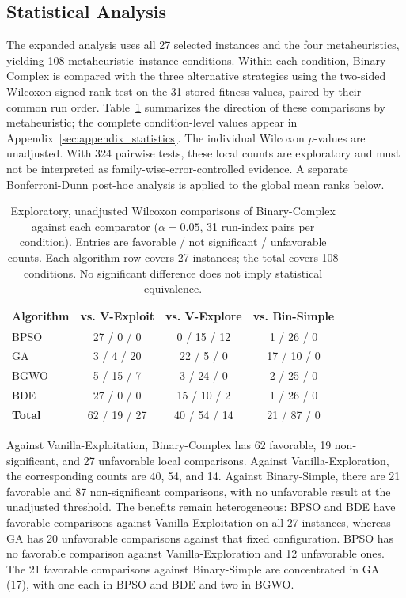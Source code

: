 \documentclass[journal,article,submit,moreauthors]{Definitions/mdpi}
\begin{document}
\subsection{Statistical Analysis}
\label{subsec:statistical_analysis}

The expanded analysis uses all 27 selected instances and the four
metaheuristics, yielding 108 metaheuristic--instance conditions. Within each
condition, Binary-Complex is compared with the three alternative strategies
using the two-sided Wilcoxon signed-rank test on the 31 stored fitness values,
paired by their common run order. Table~\ref{tab:wilcoxon_tests} summarizes
the direction of these comparisons by metaheuristic; the complete
condition-level values appear in Appendix~\ref{sec:appendix_statistics}.
The individual Wilcoxon $p$-values are unadjusted. With 324 pairwise tests,
these local counts are exploratory and must not be interpreted as
family-wise-error-controlled evidence. A separate Bonferroni-Dunn post-hoc
analysis is applied to the global mean ranks below.

\begin{table}[htbp]
  \centering
  \small
  \caption{Exploratory, unadjusted Wilcoxon comparisons of Binary-Complex
  against each comparator ($\alpha=0.05$, 31 run-index pairs per condition).
  Entries are favorable / not significant / unfavorable counts.
  Each algorithm row covers 27 instances; the total covers 108 conditions.
  No significant difference does not imply statistical equivalence.}
  \label{tab:wilcoxon_tests}
  \begin{tabular}{lccc}
    \toprule
    Algorithm & vs. V-Exploit & vs. V-Explore & vs. Bin-Simple \\
    \midrule
    BPSO & 27 / 0 / 0 & 0 / 15 / 12 & 1 / 26 / 0 \\
    GA & 3 / 4 / 20 & 22 / 5 / 0 & 17 / 10 / 0 \\
    BGWO & 5 / 15 / 7 & 3 / 24 / 0 & 2 / 25 / 0 \\
    BDE & 27 / 0 / 0 & 15 / 10 / 2 & 1 / 26 / 0 \\
    \textbf{Total} & 62 / 19 / 27 & 40 / 54 / 14 & 21 / 87 / 0 \\
    \bottomrule
  \end{tabular}
\end{table}

Against Vanilla-Exploitation, Binary-Complex has 62 favorable, 19
non-significant, and 27 unfavorable local comparisons. Against
Vanilla-Exploration, the corresponding counts are 40, 54, and 14.
Against Binary-Simple, there are 21 favorable and 87 non-significant
comparisons, with no unfavorable result at the unadjusted threshold.
The benefits remain heterogeneous: BPSO and BDE have favorable comparisons
against Vanilla-Exploitation on all 27 instances, whereas GA has 20
unfavorable comparisons against that fixed configuration. BPSO has no
favorable comparison against Vanilla-Exploration and 12 unfavorable ones.
The 21 favorable comparisons against Binary-Simple are concentrated in
GA (17), with one each in BPSO and BDE and two in BGWO.
\end{document}
